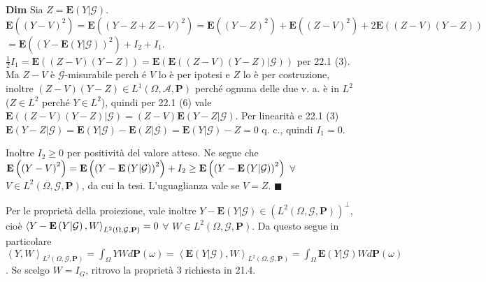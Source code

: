 \documentclass{article}
\begin{document}
\textbf{Dim} Sia $Z=\mathbf{E}\left( Y|\mathcal{G}\right) $. $\mathbf{E}%
\left( \left( Y-V\right) ^{2}\right) =\mathbf{E}\left( \left( Y-Z+Z-V\right)
^{2}\right) =\mathbf{E}\left( \left( Y-Z\right) ^{2}\right) +\mathbf{E}%
\left( \left( Z-V\right) ^{2}\right) +2\mathbf{E}\left( \left( Z-V\right)
\left( Y-Z\right) \right) $ $=\mathbf{E}\left( \left( Y-\mathbf{E}\left( Y|%
\mathcal{G}\right) \right) ^{2}\right) +I_{2}+I_{1}$. $\frac{1}{2}I_{1}=%
\mathbf{E}\left( \left( Z-V\right) \left( Y-Z\right) \right) =\mathbf{E}%
\left( \mathbf{E}\left( \left( Z-V\right) \left( Y-Z\right) |\mathcal{G}%
\right) \right) $ per 22.1 (3). Ma $Z-V$ \`{e} $\mathcal{G}$-misurabile perch%
\'{e} $V$ lo \`{e} per ipotesi e $Z$ lo \`{e} per costruzione, inoltre $%
\left( Z-V\right) \left( Y-Z\right) \in L^{1}\left( \Omega ,\mathcal{A},%
\mathbf{P}\right) $ perch\'{e} ognuna delle due v. a. \`{e} in $L^{2}$ ($%
Z\in L^{2}$ perch\'{e} $Y\in L^{2}$), quindi per 22.1 (6) vale $\mathbf{E}%
\left( \left( Z-V\right) \left( Y-Z\right) |\mathcal{G}\right) =\left(
Z-V\right) \mathbf{E}\left( Y-Z|\mathcal{G}\right) $. Per linearit\`{a} e
22.1 (3) $\mathbf{E}\left( Y-Z|\mathcal{G}\right) =\mathbf{E}\left( Y|%
\mathcal{G}\right) -\mathbf{E}\left( Z|\mathcal{G}\right) =\mathbf{E}\left(
Y|\mathcal{G}\right) -Z=0$ q. c., quindi $I_{1}=0$.

Inoltre $I_{2}\geq 0$ per positivit\`{a} del valore atteso. Ne segue che $%
\mathbf{E}\left( \left( Y-V\right) ^{2}\right) =\mathbf{E}\left( \left( Y-%
\mathbf{E}\left( Y|\mathcal{G}\right) \right) ^{2}\right) +I_{2}\geq \mathbf{%
E}\left( \left( Y-\mathbf{E}\left( Y|\mathcal{G}\right) \right) ^{2}\right) $
$\forall $ $V\in L^{2}\left( \Omega ,\mathcal{G},\mathbf{P}\right) $, da cui
la tesi. L'uguaglianza vale se $V=Z$. $\blacksquare $

Per le propriet\`{a} della proiezione, vale inoltre $Y-\mathbf{E}\left( Y|%
\mathcal{G}\right) \in \left( L^{2}\left( \Omega ,\mathcal{G},\mathbf{P}%
\right) \right) ^{\perp }$, cio\`{e} $\left\langle Y-\mathbf{E}\left( Y|%
\mathcal{G}\right) ,W\right\rangle _{L^{2}\left( \Omega ,\mathcal{G},\mathbf{%
P}\right) }=0$ $\forall $ $W\in L^{2}\left( \Omega ,\mathcal{G},\mathbf{P}%
\right) $. Da questo segue in particolare $\left\langle Y,W\right\rangle
_{L^{2}\left( \Omega ,\mathcal{G},\mathbf{P}\right) }=\int_{\Omega }YWd%
\mathbf{P}\left( \omega \right) =\left\langle \mathbf{E}\left( Y|\mathcal{G}%
\right) ,W\right\rangle _{L^{2}\left( \Omega ,\mathcal{G},\mathbf{P}\right)
}=\int_{\Omega }\mathbf{E}\left( Y|\mathcal{G}\right) Wd\mathbf{P}\left(
\omega \right) $. Se scelgo $W=I_{G}$, ritrovo la propriet\`{a} 3 richiesta
in 21.4.
\end{document}
